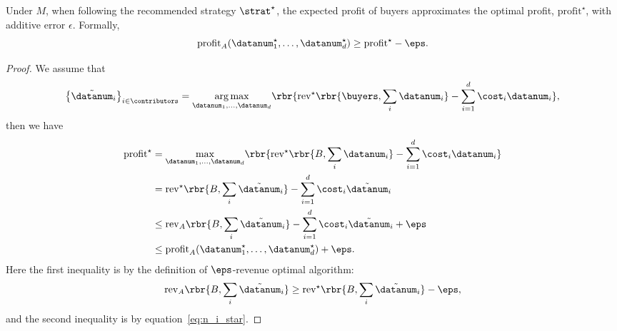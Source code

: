 \begin{lemma}
    \label{lem:main_prop5}
    Under $M$, when following the recommended strategy $\strat^\star $, the expected profit of buyers approximates the optimal profit, $\mathrm{profit}^{\star}$, with additive error $\epsilon$.
    Formally, 
    \begin{equation*}
        \mathrm{profit}_A( \datanum_1^{\star},\dots,\datanum_d^{\star}) \geq \mathrm{profit}^{\star} - \eps .       
    \end{equation*}
\end{lemma}
\begin{proof}
    We assume that 
    \[\left\{ \tilde{\datanum}_{i} \right\}_{i\in \contributors} = \underset{\datanum_1,\dots,\datanum_d}{\arg \max}\rbr{\mathrm{rev}^{\star}  \rbr{ \buyers,\sum_i \datanum_i} - \sum_{i=1}^{d} \cost_i \datanum_i  },\]
    then we have
    \begin{align*}
      \mathrm{profit}^{\star} &  = \underset{\datanum_1,\dots,\datanum_d}{\max}\rbr{\mathrm{rev}^{\star} 
        \rbr{ B,\sum_i \datanum_i} - \sum_{i=1}^{d} \cost_i \datanum_i  } \\ & = \mathrm{rev}^{\star} 
        \rbr{ B,\sum_i \tilde{\datanum}_i} - \sum_{i=1}^{d} \cost_i \tilde{\datanum}_i \\ & \leq \mathrm{rev}_A
        \rbr{ B,\sum_i \tilde{\datanum}_i} - \sum_{i=1}^{d} \cost_i \tilde{\datanum}_i  + \eps  \\ & \leq  \mathrm{profit}_A(\datanum_1^{\star},\dots,\datanum_d^{\star}) + \eps.
    \end{align*}
    Here the first inequality is by the definition of $\eps$-revenue optimal algorithm: \[\mathrm{rev}_A
        \rbr{ B,\sum_i \tilde{\datanum}_i} \geq \mathrm{rev}^{\star} 
        \rbr{ B,\sum_i \tilde{\datanum}_i}-\eps,\]
    and the second inequality is by equation~\eqref{eq:n_i_star}.
\end{proof}









